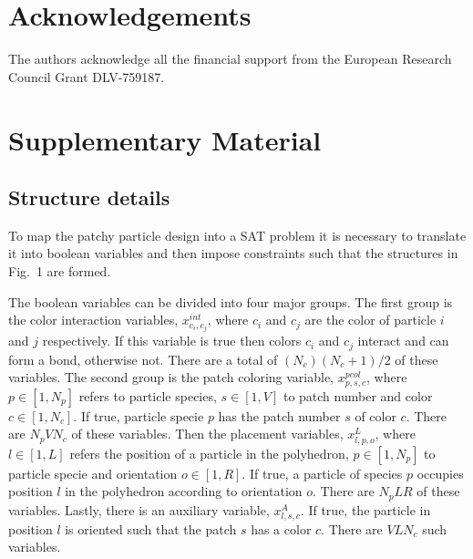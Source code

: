 \documentclass[a4paper, amsfonts, amssymb, amsmath, reprint, showkeys, nofootinbib, oneside]{revtex4-1}
\begin{document}

\section{Acknowledgements}

The authors acknowledge all the financial support from the European Research Council Grant DLV-759187.



\section{Supplementary Material}

\subsection{Structure details}

To map the patchy particle design into a SAT problem it is necessary to translate it into boolean variables and then impose constraints such that the structures in Fig.~1 are formed.

The boolean variables can be divided into four major groups. The first group is the color interaction variables, $x_{c_i,c_j}^{int}$, where $c_i$ and $c_j$ are the color of particle $i$ and $j$ respectively. If this variable is true then colors $c_i$ and $c_j$ interact and can form a bond, otherwise not. There are a total of $(N_c)(N_c+1)/2$ of these variables. The second group is the patch coloring variable, $x_{p,s,c}^{pcol}$, where $p\in [1, N_p]$ refers to particle species, $s\in [1, V]$ to patch number and color $c\in [1, N_c]$. If true, particle specie $p$ has the patch number $s$ of color $c$. There are $N_pVN_c$ of these variables. Then the placement variables, $x_{l,p,o}^{L}$, where $l\in [1, L]$ refers the position of a particle in the polyhedron, $p\in [1, N_p]$ to particle specie and orientation $o\in [1, R]$. If true, a particle of species $p$ occupies position $l$ in the polyhedron according to orientation $o$. There are $N_pLR$ of these variables. Lastly, there is an auxiliary variable, $x_{l,s,c}^{A}$. If true, the particle in position $l$ is oriented such that the patch $s$ has a color $c$. There are $VLN_c$ such variables.
\end{document}
